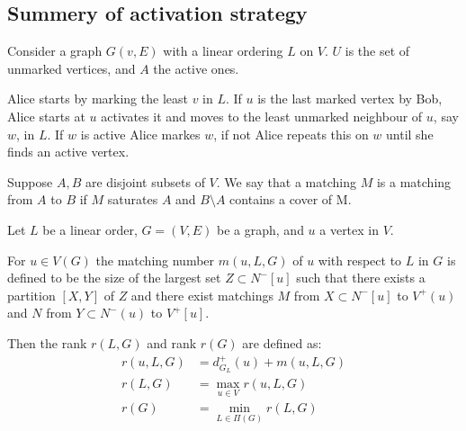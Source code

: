 \subsection{Summery of activation strategy}

Consider a graph $G(v,E)$ with a linear ordering $L$ on $V$. $U$ is the set of unmarked vertices, and $A$ the active ones.

Alice starts by marking the least $v$ in $L$. If $u$ is the last marked vertex by Bob, Alice starts at $u$ activates it and moves to the least unmarked neighbour of $u$, say $w$, in $L$. If $w$ is active Alice markes $w$, if not Alice repeats this on $w$ until she finds an active vertex.


\begin{definition} \label{defnRank}
    Suppose $A,B$ are disjoint subsets of $V$. We say that a matching $M$ is a matching from $A$ to $B$ if $M$ saturates $A$ and $B\setminus A$ contains a cover of M. 
    
    Let $L$ be a linear order, $G=(V,E)$ be a graph, and $u$ a vertex in $V$.
        
    For $u \in V(G)$ the matching number $m(u, L, G)$ of $u$ with respect to $L$ in $G$ is defined to be the size of the largest set $Z \subset N^-[u]$ such that there exists a partition $[X, Y]$ of $Z$ and there exist matchings $M$ from
    $X\subset N^-[u]$ to $V^+(u)$ and $N$ from $Y\subset N^-(u)$ to $V^+[u]$.
    
    Then the rank $r(L,G)$ and rank $r(G)$ are defined as:
    \begin{align*}
    	r(u,L,G) & = d^+_{G_L}(u) + m(u,L,G) \\
    	r(L,G)   & = \max_{u \in V}r(u,L,G)  \\
    	r(G)     & = \min_{L \in \Pi(G)} r(L,G)
    \end{align*}
\end{definition}

